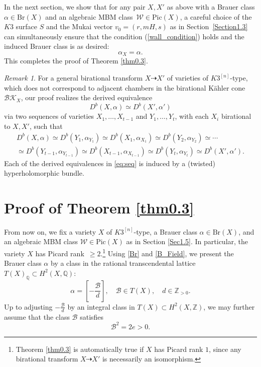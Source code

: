 \documentclass[11pt]{amsart}
\theoremstyle{plain}
\theoremstyle{definition}
\theoremstyle{remark}
\newtheorem{rmk}[thm]{Remark}
\newcommand{\BQ}{{\mathbb{Q}}}
\newcommand{\BZ}{{\mathbb{Z}}}
\newcommand{\CB}{{\mathcal B}}
\newcommand{\CW}{{\mathcal W}}
\begin{document}
In the next section, we show that for any pair $X, X'$ as above with a Brauer class $\alpha \in \mathrm{Br}(X)$ and an algebraic MBM class~$\CW \in \mathrm{Pic}(X)$, a careful choice of the $K3$ surface $S$ and the Mukai vector $v_0=(r, mH,s)$ as in Section~\ref{Section1.3} can simultaneously ensure that the condition (\ref{wall_condition}) holds and the induced Brauer class is as desired:
\begin{equation}\label{vanish2}
\alpha_X = \alpha.
\end{equation}
This completes the proof of Theorem \ref{thm0.3}.

\begin{rmk}
For a general birational transform $X \dashrightarrow X'$ of varieties of $K3^{[n]}$-type, which does not correspond to adjacent chambers in the birational K\"ahler cone $\mathcal{BK}_X$, our proof realizes the derived equivalence
\[
D^b(X,\alpha) \simeq D^b(X', \alpha')
\]
via two sequences of varieties $X_1, \ldots, X_{t - 1}$ and $Y_1, \ldots, Y_t$, with each $X_i$ birational to $X, X'$, such that
\begin{multline} \label{eq:seq}
D^b(X, \alpha) \simeq D^b(Y_1, \alpha_{Y_1}) \simeq D^b(X_1, \alpha_{X_1}) \simeq D^b(Y_2, \alpha_{Y_2}) \simeq \cdots \\
\simeq D^b(Y_{t - 1}, \alpha_{Y_{t - 1}}) \simeq D^b(X_{t - 1}, \alpha_{X_{t-1}}) \simeq D^b(Y_t, \alpha_{Y_t}) \simeq D^b(X', \alpha').
\end{multline}
Each of the derived equivalences in \eqref{eq:seq} is induced by a (twisted) hyperholomorphic bundle.
\end{rmk}

\section{Proof of Theorem \ref{thm0.3}}\label{section2}

From now on, we fix a variety $X$ of $K3^{[n]}$-type, a Brauer class $\alpha \in \mathrm{Br}(X)$, and an algebraic MBM class $\CW \in \mathrm{Pic}(X)$ as in Section \ref{Sec1.5}. In particular, the variety $X$ has Picard rank~$\geq 2$.\footnote{Theorem \ref{thm0.3} is automatically true if $X$ has Picard rank $1$, since any birational transform $X \dashrightarrow X'$ is necessarily an isomorphism.} Using \eqref{Br} and \eqref{B_Field}, we present the Brauer class $\alpha$ by a class in the rational transcendental lattice~$T(X)_\BQ \subset H^2(X, \BQ)$:
\[
\alpha = \left[-\frac{\CB}{d}\right], \quad \CB \in T(X), \quad d \in \BZ_{> 0}.
\]
Up to adjusting $-\frac{\CB}{d}$ by an integral class in $T(X) \subset H^2(X, \BZ)$, we may further assume that the class $\CB$ satisfies
\[
\CB^2 = 2e > 0.
\]
\end{document}
